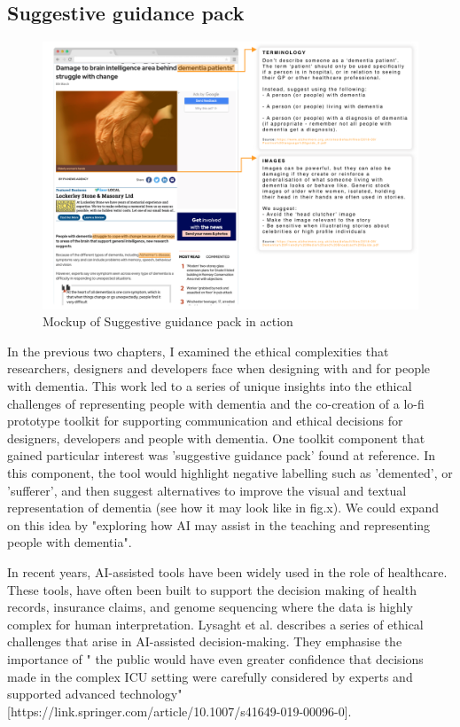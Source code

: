 \subsection{Suggestive guidance pack}
\label{FutureStudyThree}
\begin{figure}[htp]
\centering
\includegraphics[width=1\linewidth]{Images/Discussion/Aware-AI.png}
\caption{Mockup of Suggestive guidance pack
 in action}
\label{fig:AwareAI}
\end{figure}
In the previous two chapters, I examined the ethical complexities that researchers, designers and developers face when designing with and for people with dementia. This work led to a series of unique insights into the ethical challenges of representing people with dementia and the co-creation of a lo-fi prototype toolkit for supporting communication and ethical decisions for designers, developers and people with dementia. One toolkit component that gained particular interest was 'suggestive guidance pack' found at reference. In this component, the tool would highlight negative labelling such as 'demented', or 'sufferer', and then suggest alternatives to improve the visual and textual representation of dementia (see how it may look like in fig.x). We could expand on this idea by "exploring how AI may assist in the teaching and representing people with dementia".

In recent years, AI-assisted tools have been widely used in the role of healthcare. These tools, have often been built to support the decision making of health records, insurance claims, and genome sequencing where the data is highly complex for human interpretation. Lysaght et al. describes a series of ethical challenges that arise in AI-assisted decision-making. They emphasise the importance of " the public would have even greater confidence that decisions made in the complex ICU setting were carefully considered by experts and supported advanced technology" [https://link.springer.com/article/10.1007/s41649-019-00096-0].

